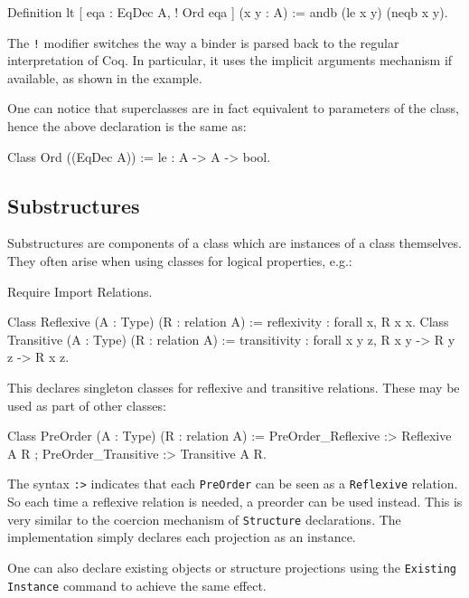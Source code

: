 \begin{coq_example}
Definition lt [ eqa : EqDec A, ! Ord eqa ] (x y : A) :=
  andb (le x y) (neqb x y).
\end{coq_example}

The \texttt{!} modifier switches the way a binder is parsed back to the
regular interpretation of Coq. In particular, it uses the implicit
arguments mechanism if available, as shown in the example.

One can notice that superclasses are in fact equivalent to parameters of
the class, hence the above declaration is the same as:
\begin{coq_example*}
Class Ord ((EqDec A)) := le : A -> A -> bool.
\end{coq_example*}

\subsection{Substructures}

Substructures are components of a class which are instances of a class
themselves. They often arise when using classes for logical properties,
e.g.:

\begin{coq_eval}
Require Import Relations.
\end{coq_eval}
\begin{coq_example*}
Class Reflexive (A : Type) (R : relation A) :=
  reflexivity : forall x, R x x.
Class Transitive (A : Type) (R : relation A) :=
  transitivity : forall x y z, R x y -> R y z -> R x z.
\end{coq_example*}

This declares singleton classes for reflexive and transitive relations. 
These may be used as part of other classes:

\begin{coq_example*}
Class PreOrder (A : Type) (R : relation A) :=
  PreOrder_Reflexive :> Reflexive A R ;
  PreOrder_Transitive :> Transitive A R.
\end{coq_example*}

The syntax \texttt{:>} indicates that each \texttt{PreOrder} can be seen
as a \texttt{Reflexive} relation. So each time a reflexive relation is
needed, a preorder can be used instead. This is very similar to the
coercion mechanism of \texttt{Structure} declarations.
The implementation simply declares each projection as an instance. 

One can also declare existing objects or structure
projections using the \texttt{Existing Instance} command to achieve the 
same effect.

